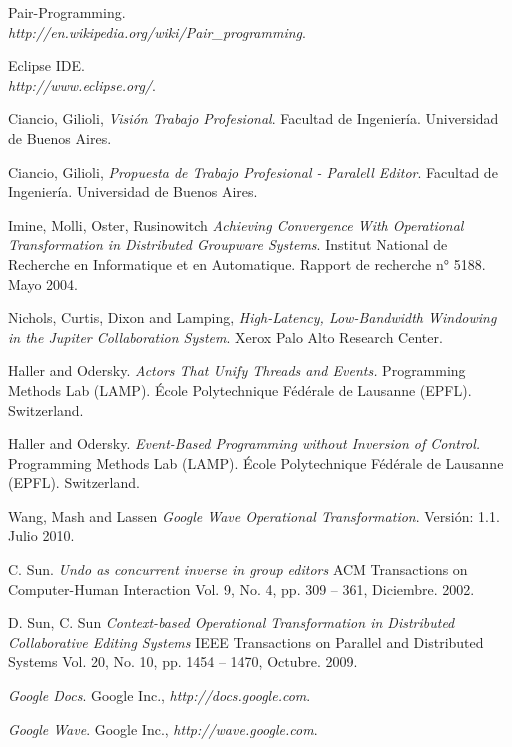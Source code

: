 \documentclass[12pt,a4paper]{article}
\begin{document}
\begin{thebibliography}{9}
	Pair-Programming. \\
	\textsl{http://en.wikipedia.org/wiki/Pair\_programming}.

	Eclipse IDE. \\
	\textsl{http://www.eclipse.org/}.

	Ciancio, Gilioli,
	\emph{Visión Trabajo Profesional}.
	Facultad de Ingeniería.
	Universidad de Buenos Aires. 

	Ciancio, Gilioli,
	\emph{Propuesta de Trabajo Profesional - Paralell Editor}.
	Facultad de Ingeniería.
	Universidad de Buenos Aires. 

	Imine, Molli, Oster, Rusinowitch
	\emph{Achieving Convergence With Operational Transformation in Distributed Groupware Systems}.
	Institut National de Recherche en Informatique et en Automatique.
	Rapport de recherche n° 5188. 
	Mayo 2004.

	Nichols, Curtis, Dixon and Lamping,
	\emph{High-Latency, Low-Bandwidth Windowing in the Jupiter Collaboration System}.
	Xerox Palo Alto Research Center.

	Haller and Odersky.
	\emph{Actors That Unify Threads and Events.}
	Programming Methods Lab (LAMP).
	École Polytechnique Fédérale de Lausanne (EPFL).
	Switzerland.
 
	Haller and Odersky.
	\emph{Event-Based Programming without Inversion of Control.}
	Programming Methods Lab (LAMP).
	École Polytechnique Fédérale de Lausanne (EPFL).
	Switzerland.

	Wang, Mash and Lassen
	\emph{Google Wave Operational Transformation}.
	Versión: 1.1.
	Julio 2010.

	C. Sun.
	\emph{Undo as concurrent inverse in group editors}
	ACM Transactions on Computer-Human Interaction
	Vol. 9, No. 4, pp. 309 – 361,
	Diciembre. 2002.

	D. Sun, C. Sun
	\emph{Context-based Operational Transformation in Distributed Collaborative Editing Systems}
	IEEE Transactions on Parallel and Distributed Systems
	Vol. 20, No. 10, pp. 1454 – 1470,
	Octubre. 2009.
		
	\emph{Google Docs}. 
	Google Inc., 
	\textsl{http://docs.google.com}.
	
	\emph{Google Wave}. Google Inc., 
	\textsl{http://wave.google.com}.


\end{thebibliography}
\end{document}
